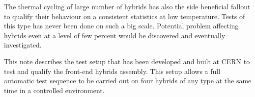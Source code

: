 The thermal cycling of large number of hybrids has also the side
beneficial fallout to qualify their behaviour on a consistent
statistics at low temperature. Tests of this type has never been done
on such a big scale. Potential problem affecting hybrids even at a
level of few percent would be discovered and eventually investigated.

This note describes the test setup that has been developed and built
at CERN to test and qualify the front-end hybrids assembly.
This setup allows a full automatic test sequence to be carried out on
four hybrids of any type at the same time in a controlled environment.


